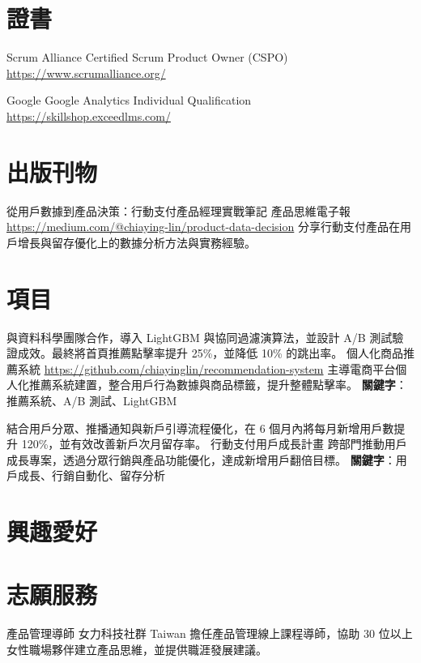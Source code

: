 \documentclass[a4paper, serif, 10pt]{moderncv}
\begin{document}
\section{證書}

        {Scrum Alliance}
        {Certified Scrum Product Owner (CSPO)}
        {\url{https://www.scrumalliance.org/}}
        {}
        {}

        {Google}
        {Google Analytics Individual Qualification}
        {\url{https://skillshop.exceedlms.com/}}
        {}
        {}
\section{出版刊物}

        {從用戶數據到產品決策：行動支付產品經理實戰筆記}
        {產品思維電子報}
        {\url{https://medium.com/@chiaying-lin/product-data-decision}}
        {}
        {分享行動支付產品在用戶增長與留存優化上的數據分析方法與實務經驗。}
\section{項目}

        {與資料科學團隊合作，導入 LightGBM 與協同過濾演算法，並設計 A/B 測試驗證成效。最終將首頁推薦點擊率提升 25\%，並降低 10\% 的跳出率。
}
        {個人化商品推薦系統}
        {\url{https://github.com/chiayinglin/recommendation-system}}
        {}
        {主導電商平台個人化推薦系統建置，整合用戶行為數據與商品標籤，提升整體點擊率。
\textbf{關鍵字}：推薦系統、A/B 測試、LightGBM}

        {結合用戶分眾、推播通知與新戶引導流程優化，在 6 個月內將每月新增用戶數提升 120\%，並有效改善新戶次月留存率。
}
        {行動支付用戶成長計畫}
        {}
        {}
        {跨部門推動用戶成長專案，透過分眾行銷與產品功能優化，達成新增用戶翻倍目標。
\textbf{關鍵字}：用戶成長、行銷自動化、留存分析}
\section{興趣愛好}

\section{志願服務}

        {產品管理導師}
        {女力科技社群 Taiwan}
        {}
        {}
        {擔任產品管理線上課程導師，協助 30 位以上女性職場夥伴建立產品思維，並提供職涯發展建議。}
\end{document}
